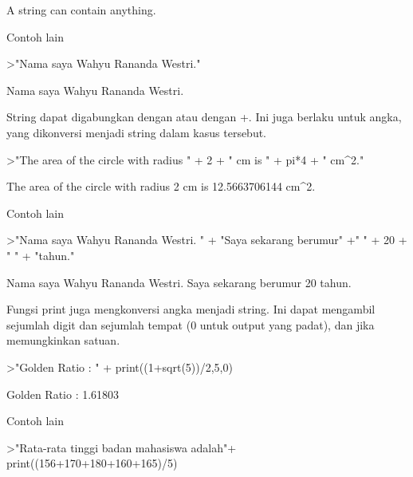 \documentclass[12pt,arial,letterpaper]{book}
\begin{document}
\begin{euleroutput}
  A string can contain anything.
\end{euleroutput}
\begin{eulercomment}
Contoh lain
\end{eulercomment}
\begin{eulerprompt}
>"Nama saya Wahyu Rananda Westri."
\end{eulerprompt}
\begin{euleroutput}
  Nama saya Wahyu Rananda Westri.
\end{euleroutput}
\begin{eulercomment}
String dapat digabungkan dengan \textbar{} atau dengan +. Ini juga berlaku
untuk angka, yang dikonversi menjadi string dalam kasus tersebut.
\end{eulercomment}
\begin{eulerprompt}
>"The area of the circle with radius " + 2 + " cm is " + pi*4 + " cm^2."
\end{eulerprompt}
\begin{euleroutput}
  The area of the circle with radius 2 cm is 12.5663706144 cm^2.
\end{euleroutput}
\begin{eulercomment}
Contoh lain
\end{eulercomment}
\begin{eulerprompt}
>"Nama saya Wahyu Rananda Westri. " + "Saya sekarang berumur" +" " + 20 + " " + "tahun."
\end{eulerprompt}
\begin{euleroutput}
  Nama saya Wahyu Rananda Westri. Saya sekarang berumur 20 tahun.
\end{euleroutput}
\begin{eulercomment}
Fungsi print juga mengkonversi angka menjadi string. Ini dapat
mengambil sejumlah digit dan sejumlah tempat (0 untuk output yang
padat), dan jika memungkinkan satuan.
\end{eulercomment}
\begin{eulerprompt}
>"Golden Ratio : " + print((1+sqrt(5))/2,5,0)
\end{eulerprompt}
\begin{euleroutput}
  Golden Ratio : 1.61803
\end{euleroutput}
\begin{eulercomment}
Contoh lain
\end{eulercomment}
\begin{eulerprompt}
>"Rata-rata tinggi badan mahasiswa adalah"+ print((156+170+180+160+165)/5)
\end{eulerprompt}
\end{document}
